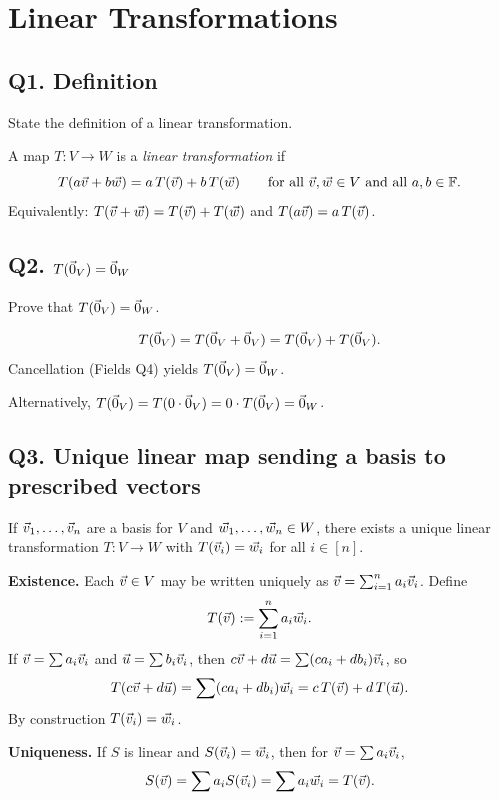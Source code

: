 \section{Linear Transformations}

\subsection{Q1. Definition}

\begin{promptbox}
State the definition of a linear transformation.
\end{promptbox}

\begin{coursebox}
\begin{definition*}
A map $T:V\to W$ is a \emph{linear transformation} if
\[
T(a\vec{v}+b\vec{w})=a\,T(\vec{v})+b\,T(\vec{w})
\qquad\text{for all }\vec{v},\vec{w}\in V\text{ and all }a,b\in\mathbb{F}.
\]
Equivalently: $T(\vec{v}+\vec{w})=T(\vec{v})+T(\vec{w})$ and $T(a\vec{v})=a\,T(\vec{v})$.
\end{definition*}
\end{coursebox}

\subsection{Q2. $T(\vec{0}_V)=\vec{0}_W$}

\begin{promptbox}
Prove that $T(\vec{0}_V)=\vec{0}_W$.
\end{promptbox}

\begin{coursebox}
\[
T(\vec{0}_V)=T(\vec{0}_V+\vec{0}_V)=T(\vec{0}_V)+T(\vec{0}_V).
\]
Cancellation (Fields Q4) yields $T(\vec{0}_V)=\vec{0}_W$.

Alternatively, $T(\vec{0}_V)=T(0\cdot\vec{0}_V)=0\cdot T(\vec{0}_V)=\vec{0}_W$.
\end{coursebox}

\subsection{Q3. Unique linear map sending a basis to prescribed vectors}

\begin{promptbox}
If $\vec{v}_1,\ldots,\vec{v}_n$ are a basis for $V$ and $\vec{w}_1,\ldots,\vec{w}_n\in W$, there
exists a unique linear transformation $T:V\to W$ with $T(\vec{v}_i)=\vec{w}_i$ for all
$i\in[n]$.
\end{promptbox}

\begin{coursebox}
\textbf{Existence.}
Each $\vec{v}\in V$ may be written uniquely as $\vec{v}=\sum_{i=1}^n a_i\vec{v}_i$. Define
\[
T(\vec{v}):=\sum_{i=1}^n a_i\vec{w}_i.
\]
If $\vec{v}=\sum a_i\vec{v}_i$ and $\vec{u}=\sum b_i\vec{v}_i$, then
$c\vec{v}+d\vec{u}=\sum(ca_i+db_i)\vec{v}_i$, so
\[
T(c\vec{v}+d\vec{u})=\sum(ca_i+db_i)\vec{w}_i=c\,T(\vec{v})+d\,T(\vec{u}).
\]
By construction $T(\vec{v}_i)=\vec{w}_i$.

\textbf{Uniqueness.}
If $S$ is linear and $S(\vec{v}_i)=\vec{w}_i$, then for $\vec{v}=\sum a_i\vec{v}_i$,
\[
S(\vec{v})=\sum a_i S(\vec{v}_i)=\sum a_i\vec{w}_i=T(\vec{v}).
\]
\end{coursebox}

